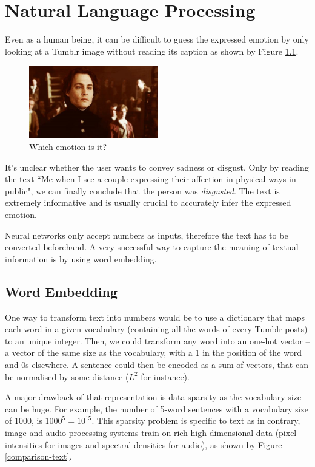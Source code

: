 \chapter{Natural Language Processing}
Even as a human being, it can be difficult to guess the expressed emotion by only looking at a Tumblr image without reading its caption as shown by Figure \ref{disgusted-unclear}.

\begin{figure}[H]
    \centering
    \includegraphics[width=0.5\textwidth]{Images/disgusted.jpg}
    \caption{Which emotion is it?}
    \label{disgusted-unclear}
\end{figure}

It's unclear whether the user wants to convey sadness or disgust. Only by reading the text ``Me when I see a couple expressing their affection in physical ways in public", we can finally conclude that the person was {\em disgusted}. The text is extremely informative and is usually crucial to accurately infer the expressed emotion.

Neural networks only accept numbers as inputs, therefore the text has to be converted beforehand. A very successful way to capture the meaning of textual information is by using word embedding.
\newpage
\section{Word Embedding}
One way to transform text into numbers would be to use a dictionary that maps each word in a given vocabulary (containing all the words of every Tumblr posts) to an unique integer. Then, we could transform any word into an one-hot vector -- a vector of the same size as the vocabulary, with a 1 in the position of the word and 0s elsewhere. A sentence could then be encoded as a sum of vectors, that can be normalised by some distance ($L^2$ for instance).

A major drawback of that representation is data sparsity as the vocabulary size can be huge. For example, the number of 5-word sentences with a vocabulary size of 1000, is $1000^5=10^{15}$. This sparsity problem is specific to text as in contrary, image and audio processing systems train on rich high-dimensional data (pixel intensities for images and spectral densities for audio), as shown by Figure \ref{comparison-text}.


